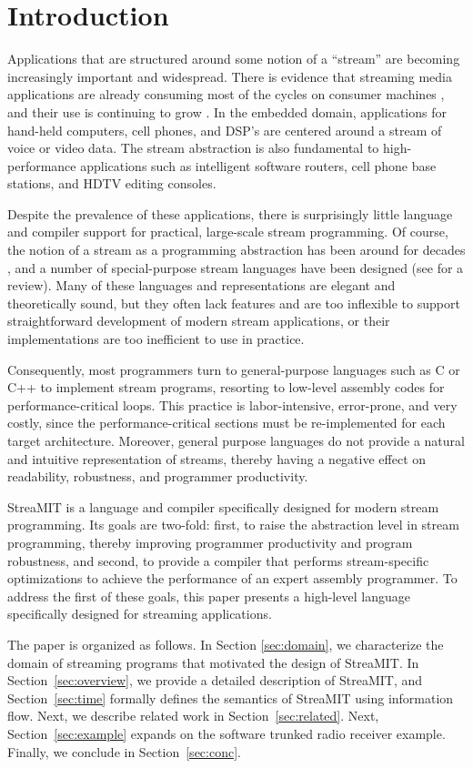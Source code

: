 \section{Introduction}

Applications that are structured around some notion of a ``stream''
are becoming increasingly important and widespread.  There is evidence
that streaming media applications are already consuming most of the
cycles on consumer machines \cite{Rix98}, and their use is continuing
to grow \cite{someone}.  In the embedded domain, applications for
hand-held computers, cell phones, and DSP's are centered around a
stream of voice or video data.  The stream abstraction is also
fundamental to high-performance applications such as intelligent
software routers, cell phone base stations, and HDTV editing consoles.

Despite the prevalence of these applications, there is surprisingly
little language and compiler support for practical, large-scale stream
programming.  Of course, the notion of a stream as a programming
abstraction has been around for decades \cite{SICP}, and a number of
special-purpose stream languages have been designed (see
\cite{survey97} for a review).  Many of these languages and
representations are elegant and theoretically sound, but they often
lack features and are too inflexible to support straightforward
development of modern stream applications, or their implementations
are too inefficient to use in practice.

Consequently, most programmers turn to general-purpose languages such
as C or C++ to implement stream programs, resorting to low-level
assembly codes for performance-critical loops.  This practice is
labor-intensive, error-prone, and very costly, since the
performance-critical sections must be re-implemented for each target
architecture.  Moreover, general purpose languages do not provide a
natural and intuitive representation of streams, thereby having a
negative effect on readability, robustness, and programmer
productivity.

StreaMIT is a language and compiler specifically designed for modern
stream programming.  Its goals are two-fold: first, to raise the
abstraction level in stream programming, thereby improving programmer
productivity and program robustness, and second, to provide a compiler
that performs stream-specific optimizations to achieve the performance
of an expert assembly programmer.  To address the first of these
goals, this paper presents a high-level language specifically designed
for streaming applications.  

The paper is organized as follows. In Section {\ref{sec:domain}}, we
characterize the domain of streaming programs that motivated the
design of StreaMIT.  In Section~\ref{sec:overview}, we provide a
detailed description of StreaMIT, and Section~\ref{sec:time} formally
defines the semantics of StreaMIT using information flow. Next, we
describe related work in Section~\ref{sec:related}.  Next,
Section~\ref{sec:example} expands on the software trunked radio
receiver example. Finally, we conclude in Section~\ref{sec:conc}.


